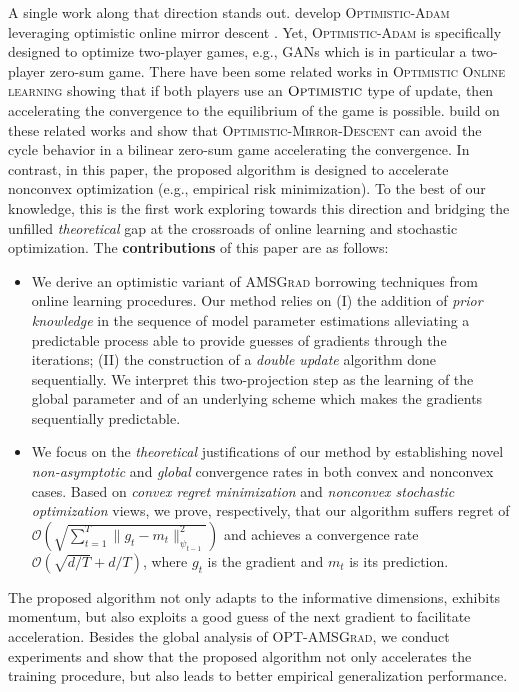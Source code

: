 \documentclass[twoside]{article}
\begin{document}
A single work along that direction stands out. \cite{DISZ18} develop \textsc{Optimistic-Adam} leveraging optimistic online mirror descent \citep{RS13b}.
Yet, \textsc{Optimistic-Adam} is specifically designed to optimize two-player games, e.g., GANs \citep{goodfellow2014generative} which is in particular a two-player zero-sum game. There have been some related works in \textsc{Optimistic Online learning} \citep{CJ12,RS13b,SALS15} showing that if both players use an $\textsc{Optimistic}$ type of update, then accelerating the convergence to the equilibrium of the game is possible.
\cite{DISZ18} build on these related works and show that \textsc{Optimistic-Mirror-Descent} can avoid the cycle behavior in a bilinear zero-sum game accelerating the convergence. 
In contrast, in this paper, the proposed algorithm is designed to accelerate nonconvex optimization (e.g., empirical risk minimization).
To the best of our knowledge, this is the first work exploring towards this direction and bridging the unfilled \emph{theoretical} gap at the crossroads of online learning and stochastic optimization.
The \textbf{contributions} of this paper are as follows:
\begin{itemize}
\item We derive an optimistic variant of \textsc{AMSGrad} borrowing techniques from online learning procedures. Our method relies on \textsf{(I)} the addition of \emph{prior knowledge} in the sequence of  model parameter estimations alleviating a predictable process able to provide guesses of gradients through the iterations; \textsf{(II)} the construction of a \emph{double update} algorithm done sequentially. We interpret this two-projection step as the learning of the global parameter and of an underlying scheme which makes the gradients sequentially predictable.
\item We focus on the  \emph{theoretical} justifications of our method by establishing novel \emph{non-asymptotic} and \emph{global} convergence rates in both convex and nonconvex cases.  Based on \emph{convex regret minimization} and \emph{nonconvex stochastic optimization} views, we prove, respectively, that our algorithm suffers regret of $\mathcal{O}(\sqrt{\sum_{t=1}^T \| g_t - m_t  \|^2_{\psi_{t-1}}})$ and achieves a convergence rate $\mathcal{O}(\sqrt{d/T} +d/T )$, where $g_t$ is the gradient and $m_t$ is its prediction.
\end{itemize}
The proposed algorithm not only adapts to the informative dimensions, exhibits momentum, but also exploits a good guess of the next gradient to facilitate acceleration. 
Besides the global analysis of \textsc{OPT-AMSGrad}, we conduct experiments and show that the proposed algorithm not only accelerates the training procedure, but also leads to better empirical generalization performance.
\end{document}
